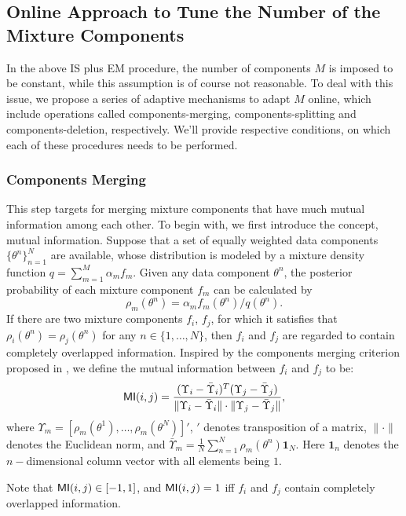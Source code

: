 \subsection {Online Approach to Tune the Number of the Mixture Components}

In the above IS plus EM procedure, the number of components $M$ is
imposed to be constant, while this assumption is of course not
reasonable. To deal with this issue, we propose a series of adaptive
mechanisms to adapt $M$ online, which include operations called
components-merging, components-splitting and components-deletion,
respectively. We'll provide respective conditions, on which each of
these procedures needs to be performed.

\subsubsection{Components Merging}
This step targets for merging mixture components that have much
mutual information among each other. To begin with, we first
introduce the concept, mutual information. Suppose that a set of
equally weighted data components $\{\theta^n\}_{n=1}^N$ are
available, whose distribution is modeled by a mixture density
function $q=\sum_{m=1}^M\alpha_mf_m$. Given any data component
$\theta^n$, the posterior probability of each mixture component
$f_m$ can be calculated by
\begin{equation}
\rho_m(\theta^n)=\alpha_m f_m(\theta^n)/q(\theta^n).
\end{equation}
If there are two mixture components $f_i$, $f_j$, for which it
satisfies that $\rho_i(\theta^n)=\rho_j(\theta^n)$ for any
$n\in\{1,\ldots,N\}$, then $f_i$ and $f_j$ are regarded to contain
completely overlapped information. Inspired by the components
merging criterion proposed in \cite{ueda2000sam,wang2004estimation},
we define the mutual information between $f_i$ and $f_j$ to be:
\begin{equation}\label{mutual_info}
\MI(i,j)=\frac{(\Upsilon_i-\bar{\Upsilon}_i)^T(\Upsilon_j-\bar{\Upsilon}_j)}{\|\Upsilon_i-\bar{\Upsilon}_i\|\cdot\|\Upsilon_j-\bar{\Upsilon}_j\|},
\end{equation}
 where
$\Upsilon_m=[\rho_m(\theta^1),\ldots,\rho_m(\theta^N)]'$, $'$
denotes transposition of a matrix, $\|\cdot\|$ denotes the Euclidean
norm, and $\bar{\Upsilon}_m=\frac{1}{N}\sum_{n=1}^N
\rho_m(\theta^n)\textbf{1}_N$. Here $\textbf{1}_n$ denotes the
$n-$dimensional column vector with all elements being $1$.

Note that $\textsf{MI}(i,j)\in[-1,1]$, and $\textsf{MI}(i,j)=1$ iff $f_i$ and $f_j$
contain completely overlapped information.

